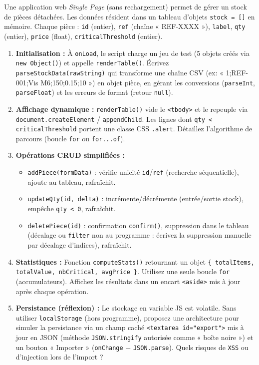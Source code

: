 \documentclass[11pt]{article}
\begin{document}
\begin{exercice}
Une application web \textit{Single Page} (sans rechargement) permet de gérer un stock de pièces détachées. Les données résident dans un tableau d'objets \texttt{stock = []} en mémoire. Chaque pièce : \texttt{id} (entier), \texttt{ref} (chaîne « REF-XXXX »), \texttt{label}, \texttt{qty} (entier), \texttt{price} (float), \texttt{criticalThreshold} (entier).
\begin{enumerate}
    \item \textbf{Initialisation :} À \texttt{onLoad}, le script charge un jeu de test (5 objets créés via \texttt{new Object()}) et appelle \texttt{renderTable()}. Écrivez \texttt{parseStockData(rawString)} qui transforme une chaîne CSV (ex: « 1;REF-001;Vis M6;150;0.15;10 ») en objet pièce, en gérant les conversions (\texttt{parseInt}, \texttt{parseFloat}) et les erreurs de format (retour \texttt{null}).
    \item \textbf{Affichage dynamique :} \texttt{renderTable()} vide le \texttt{<tbody>} et le repeuple via \texttt{document.createElement} / \texttt{appendChild}. Les lignes dont \texttt{qty < criticalThreshold} portent une classe CSS \texttt{.alert}. Détaillez l'algorithme de parcours (boucle \texttt{for} ou \texttt{for...of}).
    \item \textbf{Opérations CRUD simplifiées :}
    \begin{itemize}
        \item \texttt{addPiece(formData)} : vérifie unicité \texttt{id}/\texttt{ref} (recherche séquentielle), ajoute au tableau, rafraîchit.
        \item \texttt{updateQty(id, delta)} : incrémente/décrémente (entrée/sortie stock), empêche \texttt{qty < 0}, rafraîchit.
        \item \texttt{deletePiece(id)} : confirmation \texttt{confirm()}, suppression dans le tableau (décalage ou \texttt{filter} non au programme : écrivez la suppression manuelle par décalage d'indices), rafraîchit.
    \end{itemize}
    \item \textbf{Statistiques :} Fonction \texttt{computeStats()} retournant un objet \texttt{\{ totalItems, totalValue, nbCritical, avgPrice \}}. Utilisez une seule boucle \texttt{for} (accumulateurs). Affichez les résultats dans un encart \texttt{<aside>} mis à jour après chaque opération.
    \item \textbf{Persistance (réflexion) :} Le stockage en variable JS est volatile. Sans utiliser \texttt{localStorage} (hors programme), proposez une architecture pour simuler la persistance via un champ caché \texttt{<textarea id="export">} mis à jour en JSON (méthode \texttt{JSON.stringify} autorisée comme « boîte noire ») et un bouton « Importer » (\texttt{onChange} + \texttt{JSON.parse}). Quels risques de \texttt{XSS} ou d'injection lors de l'import ?
\end{enumerate}
\end{exercice}
\end{document}
